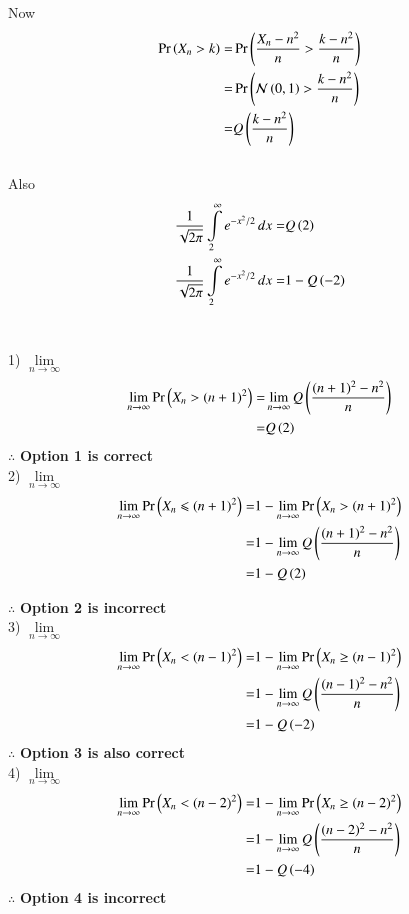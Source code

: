 \documentclass[journal,12pt,twocolumn]{IEEEtran}
\begin{document}
Now 
{
\begin{align}
    \Pr\left(X_n>k\right) =& \Pr\left(\frac{X_n-n^2}{n}>\frac{k-n^2}{n}\right)
    \\=& \Pr\left(\mathcal{N}\left(0,1\right)>\frac{k-n^2}{n}\right)
    \\ =& Q\left(\frac{k-n^2}{n}\right)
    \label{eq-cdf}
\end{align}
}
\\[4ex]
Also
\begin{align}
    \frac{1}{\sqrt{2\pi}} \int \limits_2^{\infty} e^{-x^2/2}\,dx=& Q\left(2\right)
    \\\frac{1}{\sqrt{2\pi}} \int \limits_2^{\infty} e^{-x^2/2}\,dx=&1-Q\left(-2\right)
\end{align}
\\[4ex]
{
\small
1) $\lim \limits_{n \to \infty} $ 
\begin{align}
    \lim \limits_{n \to \infty} \Pr\left(X_n > (n+1)^2\right) =& \lim \limits_{n \to \infty}Q \left(\frac{(n+1)^2-n^2}{n}\right)
    \\=&Q\left(2\right)
\end{align}
$\mathbf{\therefore}$ \textbf{Option 1 is correct}
\\[8ex]
2) $\lim \limits_{n \to \infty} $ 
\begin{align}
    \lim \limits_{n \to \infty}  \Pr\left(X_n \leqslant (n+1)^2\right) =&1-\lim \limits_{n \to \infty}  \Pr\left(X_n > (n+1)^2\right)
    \\=&1- \lim \limits_{n \to \infty}Q \left(\frac{(n+1)^2-n^2}{n}\right)
    \\=&1- Q \left(2\right)
\end{align}

$\mathbf{\therefore}$ \textbf{Option 2 is incorrect}
\\[4ex]3) $\lim \limits_{n \to \infty} $ 
\begin{align}
    \lim \limits_{n \to \infty}  \Pr\left(X_n < (n-1)^2\right) =& 1-\lim \limits_{n \to \infty}  \Pr\left(X_n \geq (n-1)^2\right)
    \\=&1-\lim \limits_{n \to \infty}Q \left(\frac{(n-1)^2-n^2}{n}\right)
    \\=& 1-Q \left(-2\right)
\end{align}
$\mathbf{\therefore}$ \textbf{Option 3 is also correct}
\\[4ex]
4) $\lim \limits_{n \to \infty} $ 
\begin{align}
    \lim \limits_{n \to \infty}  \Pr\left(X_n < (n-2)^2\right) =& 1-\lim \limits_{n \to \infty}  \Pr\left(X_n \geq (n-2)^2\right)
    \\=&1-\lim \limits_{n \to \infty}Q \left(\frac{(n-2)^2-n^2}{n}\right)
    \\=&1- Q \left(-4\right)
\end{align}
$\mathbf{\therefore}$ \textbf{Option 4 is incorrect}
}%
\end{document}

